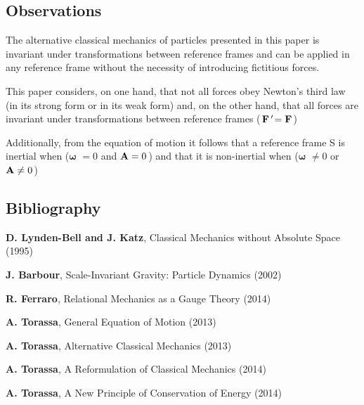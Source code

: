 \documentclass[10pt]{article}
\newcommand{\VA}{\mathbf{A}}
\newcommand{\vF}{\mathbf{F}}
\newcommand{\aV}{\mathbf{\omega}}
\begin{document}
\vspace{+0.00em}

{\centering\subsection*{Observations}}

\vspace{+0.90em}

\par The alternative classical mechanics of particles presented in this paper is invariant under transformations between reference frames and can be applied in any reference frame without the necessity of introducing fictitious forces.
\bigskip
\par This paper considers, on one hand, that not all forces obey Newton's third law (in its strong form or in its weak form) and, on the other hand, that all forces are invariant under transformations between reference frames ($\hspace{+0.09em}\vF\,'\hspace{-0.18em}=\vF\hspace{+0.12em}$)
\bigskip
\par Additionally, from the equation of motion it follows that a reference frame S is inertial when ({\large$\aV$} $=0$ and $\VA=0\hspace{+0.09em}$) and that it is non-inertial when ({\large$\aV$} $\ne 0$ or $\VA \ne 0\hspace{+0.09em}$)

\vspace{+1.50em}

{\centering\subsection*{Bibliography}}

\vspace{+1.20em}

\par \textbf{D. Lynden-Bell and J. Katz}, Classical Mechanics without Absolute Space (1995)
\bigskip
\par \textbf{J. Barbour}, Scale-Invariant Gravity: Particle Dynamics (2002)
\bigskip
\par \textbf{R. Ferraro}, Relational Mechanics as a Gauge Theory (2014)
\bigskip
\par \textbf{A. Torassa}, General Equation of Motion (2013)
\bigskip
\par \textbf{A. Torassa}, Alternative Classical Mechanics (2013)
\bigskip
\par \textbf{A. Torassa}, A Reformulation of Classical Mechanics (2014)
\bigskip
\par \textbf{A. Torassa}, A New Principle of Conservation of Energy (2014)
\end{document}
